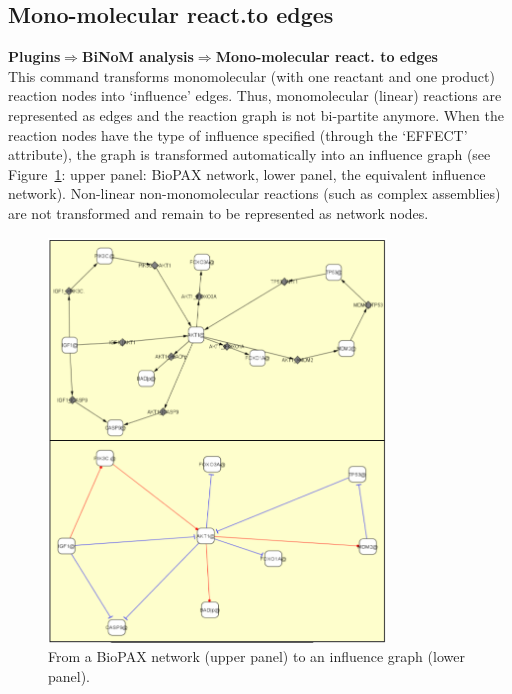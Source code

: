 \subsection{Mono-molecular react.to edges}
\textbf{Plugins$\Rightarrow$BiNoM analysis$\Rightarrow$Mono-molecular react. to edges}\\
This command transforms monomolecular (with one reactant and one product) reaction nodes into ‘influence’ edges. Thus, monomolecular (linear) reactions are represented as edges and the reaction graph is not bi-partite anymore. When the reaction nodes have the type of influence specified (through the ‘EFFECT’ attribute), the graph is transformed automatically into an influence graph (see Figure~\ref{Network_to_influence_graph}: upper panel: BioPAX network, lower panel, the equivalent influence network). Non-linear non-monomolecular reactions (such as complex assemblies) are not transformed and remain to be represented as network nodes.
\begin{figure}
\centering
\includegraphics[width=0.8\textwidth]{graphics/Network_to_influence_graph}
\caption{From a BioPAX network (upper panel) to an influence graph (lower panel).}
\label{Network_to_influence_graph}
\end{figure}

